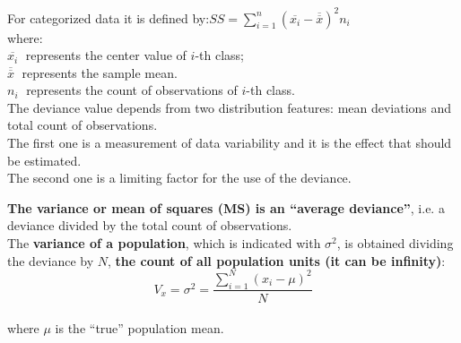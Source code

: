 \begin{frame}
  \vspace*{.25cm}
  For categorized data it is defined by:\hspace{.5cm}$SS=\sum_{i=1}^n{\left(\overline{x_i}-\overline{\overline{x}}\right)^2}n_i$\\
  \vspace*{.3cm}
  \hspace*{2cm} where:\\
  \vspace*{.25cm}
  \hspace*{2cm} $\overline{x_i}\;$ represents the center value of $i$-th class;\\
  \vspace*{.25cm}
  \hspace*{2cm} $\overline{\overline{x}}\;$ represents the sample mean.\\
  \vspace*{.25cm}
  \hspace*{2cm} $n_i\;$ represents the count of observations of $i$-th class.\\
  \vspace*{.3cm}
  The deviance value depends from two distribution features: mean deviations and total count of observations.\\
  \vspace*{.25cm}
  The first one is a measurement of data variability and it is the effect that should be estimated.\\
  \vspace*{.25cm}
  The second one is a limiting factor for the use of the deviance.\\
\end{frame}


\begin{frame}
  \vspace*{.25cm}
  \textbf{The variance or mean of squares (MS) is an ``average deviance''}, i.e. a deviance divided by the total count of observations.\\
  \vspace*{.25cm}
  The \textbf{variance of a population}, which is indicated with {\boldmath $ \sigma^2 $}, is obtained dividing the deviance by {\boldmath $ N $}, \textbf{the count of all population units (it can be infinity)}:\\
  \vspace*{.3cm}
  $$ V_x = \sigma^2 = \frac{\sum_{i=1}^N{\left(x_i-\mu\right)^2}}{N} $$ \\
  \vspace*{.7cm}
  where $ \mu $ is the ``true'' population mean.
\end{frame}

